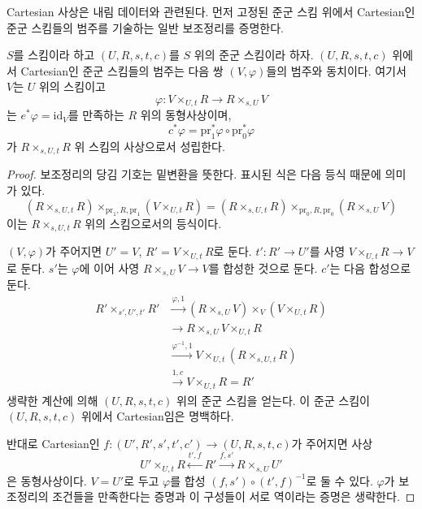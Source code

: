\noindent
Cartesian 사상은 내림 데이터와 관련된다. 먼저 고정된 준군 스킴 위에서 Cartesian인 준군 스킴들의 범주를
기술하는 일반 보조정리를 증명한다.

\begin{lemma}
\label{lemma-characterize-cartesian-schemes}
$S$를 스킴이라 하고 $(U, R, s, t, c)$를 $S$ 위의 준군 스킴이라 하자. $(U, R, s, t, c)$ 위에서 Cartesian인
준군 스킴들의 범주는 다음 쌍 $(V, \varphi)$들의 범주와 동치이다. 여기서 $V$는 $U$ 위의 스킴이고
$$
\varphi :
V \times_{U, t} R
\longrightarrow
R \times_{s, U} V
$$
는 $e^*\varphi = \text{id}_V$를 만족하는 $R$ 위의 동형사상이며,
$$
c^*\varphi = \text{pr}_1^*\varphi \circ \text{pr}_0^*\varphi
$$
가 $R \times_{s, U, t} R$ 위 스킴의 사상으로서 성립한다.
\end{lemma}

\begin{proof}
보조정리의 당김 기호는 밑변환을 뜻한다. 표시된 식은 다음 등식 때문에 의미가 있다.
$$
(R \times_{s, U, t} R) \times_{\text{pr}_1, R, \text{pr}_1} (V \times_{U, t} R)
=
(R \times_{s, U, t} R) \times_{\text{pr}_0, R, \text{pr}_0} (R \times_{s, U} V)
$$
이는 $R \times_{s, U, t} R$ 위의 스킴으로서의 등식이다.

\medskip\noindent
$(V, \varphi)$가 주어지면 $U' = V$, $R' = V \times_{U, t} R$로 둔다. $t' : R' \to U'$를 사영
$V \times_{U, t} R \to V$로 둔다. $s'$는 $\varphi$에 이어 사영 $R \times_{s, U} V \to V$를 합성한 것으로 둔다.
$c'$는 다음 합성으로 둔다.
\begin{align*}
R' \times_{s', U', t'} R'
& \xrightarrow{\varphi, 1}
(R \times_{s, U} V) \times_V (V \times_{U, t} R) \\
& \xrightarrow{}
R \times_{s, U} V \times_{U, t} R \\
& \xrightarrow{\varphi^{-1}, 1}
V \times_{U, t} (R \times_{s, U, t} R) \\
& \xrightarrow{1, c}
V \times_{U, t} R = R'
\end{align*}
생략한 계산에 의해 $(U, R, s, t, c)$ 위의 준군 스킴을 얻는다. 이 준군 스킴이 $(U, R, s, t, c)$ 위에서
Cartesian임은 명백하다.

\medskip\noindent
반대로 Cartesian인 $f : (U', R', s', t', c') \to (U, R, s, t, c)$가 주어지면 사상
$$
U' \times_{U, t} R \xleftarrow{t', f} R' \xrightarrow{f, s'} R \times_{s, U} U'
$$
은 동형사상이다. $V = U'$로 두고 $\varphi$를 합성 $(f, s') \circ (t', f)^{-1}$로 둘 수 있다.
$\varphi$가 보조정리의 조건들을 만족한다는 증명과 이 구성들이 서로 역이라는 증명은 생략한다.
\end{proof}

